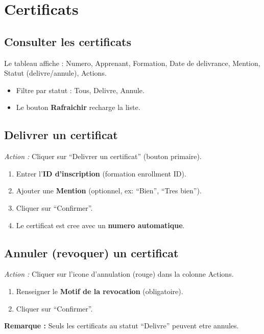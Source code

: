 \documentclass[a4paper,11pt]{article}
\newcommand{\etape}[1]{\textcolor{step}{\textbf{\'Etape :} #1}}
\newcommand{\action}[1]{\textcolor{brand}{\textit{Action :} #1}}
\newcommand{\remarque}[1]{\textcolor{warn}{\textbf{Remarque :} #1}}
\begin{document}
\section{Certificats}

\subsection{Consulter les certificats}
Le tableau affiche : Numero, Apprenant, Formation, Date de delivrance, Mention, Statut (delivre/annule), Actions.
\begin{itemize}
  \item Filtre par statut : Tous, Delivre, Annule.
  \item Le bouton \textbf{Rafraichir} recharge la liste.
\end{itemize}

\subsection{Delivrer un certificat}
\action{Cliquer sur ``Delivrer un certificat'' (bouton primaire).}
\begin{enumerate}[label=\etape{\arabic*}]
  \item Entrer l'\textbf{ID d'inscription} (formation enrollment ID).
  \item Ajouter une \textbf{Mention} (optionnel, ex: ``Bien'', ``Tres bien'').
  \item Cliquer sur ``Confirmer''.
  \item Le certificat est cree avec un \textbf{numero automatique}.
\end{enumerate}

\subsection{Annuler (revoquer) un certificat}
\action{Cliquer sur l'icone d'annulation (rouge) dans la colonne Actions.}
\begin{enumerate}[label=\etape{\arabic*}]
  \item Renseigner le \textbf{Motif de la revocation} (obligatoire).
  \item Cliquer sur ``Confirmer''.
\end{enumerate}

\remarque{Seuls les certificats au statut ``Delivre'' peuvent etre annules.}
\end{document}
